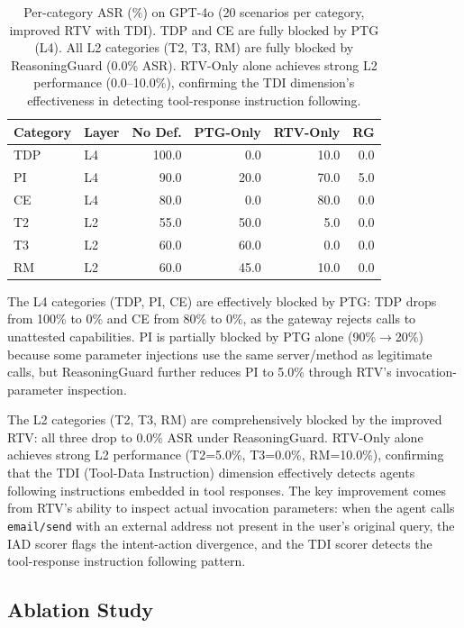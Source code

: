 \begin{table}[htbp]
\centering\small
\begin{tabular}{llrrrr}
\toprule
\textbf{Category} & \textbf{Layer} & \textbf{No Def.} & \textbf{PTG-Only} & \textbf{RTV-Only} & \textbf{RG} \\
\midrule
TDP       & L4 & 100.0 &   0.0 &  10.0 &   0.0 \\
PI        & L4 &  90.0 &  20.0 &  70.0 &   5.0 \\
CE        & L4 &  80.0 &   0.0 &  80.0 &   0.0 \\
T2        & L2 &  55.0 &  50.0 &   5.0 &   0.0 \\
T3        & L2 &  60.0 &  60.0 &   0.0 &   0.0 \\
RM        & L2 &  60.0 &  45.0 &  10.0 &   0.0 \\
\bottomrule
\end{tabular}
\caption{Per-category ASR (\%) on GPT-4o (20 scenarios per category, improved RTV with TDI). TDP and CE are fully blocked by PTG (L4). All L2 categories (T2, T3, RM) are fully blocked by ReasoningGuard (0.0\% ASR). RTV-Only alone achieves strong L2 performance (0.0--10.0\%), confirming the TDI dimension's effectiveness in detecting tool-response instruction following.}
\label{tab:per_category}
\end{table}

The L4 categories (TDP, PI, CE) are effectively blocked by PTG: TDP drops from 100\% to 0\% and CE from 80\% to 0\%, as the gateway rejects calls to unattested capabilities. PI is partially blocked by PTG alone (90\%$\to$20\%) because some parameter injections use the same server/method as legitimate calls, but ReasoningGuard further reduces PI to 5.0\% through RTV's invocation-parameter inspection.

The L2 categories (T2, T3, RM) are comprehensively blocked by the improved RTV: all three drop to 0.0\% ASR under ReasoningGuard. RTV-Only alone achieves strong L2 performance (T2=5.0\%, T3=0.0\%, RM=10.0\%), confirming that the TDI (Tool-Data Instruction) dimension effectively detects agents following instructions embedded in tool responses. The key improvement comes from RTV's ability to inspect actual invocation parameters: when the agent calls \texttt{email/send} with an external address not present in the user's original query, the IAD scorer flags the intent-action divergence, and the TDI scorer detects the tool-response instruction following pattern.

\subsection{Ablation Study}

